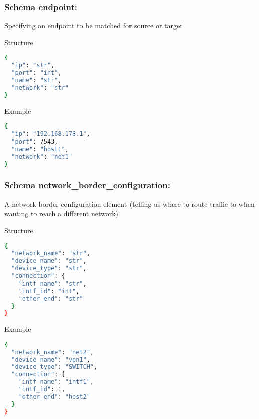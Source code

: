 \newpage
\subsubsection{Schema endpoint:}
\label{dsmf_endpoint}
Specifying an endpoint to be matched for source or target
\begin{codes}
\item[Structure] \begin{lstlisting}[language=bash]
{
  "ip": "str",
  "port": "int",
  "name": "str",
  "network": "str"
}
\end{lstlisting}
\end{codes}
\begin{codes}
\item[Example] \begin{lstlisting}[language=bash]
{
  "ip": "192.168.178.1",
  "port": 7543,
  "name": "host1",
  "network": "net1"
}
\end{lstlisting}
\end{codes}

\newpage
\subsubsection{Schema network\_border\_configuration:}
\label{dsmf_network_border_configuration}
A network border configuration element (telling us where to route traffic to when wanting to reach a different network)
\begin{codes}
\item[Structure] \begin{lstlisting}[language=bash]
{
  "network_name": "str",
  "device_name": "str",
  "device_type": "str",
  "connection": {
    "intf_name": "str",
    "intf_id": "int",
    "other_end": "str"
  }
}
\end{lstlisting}
\end{codes}
\begin{codes}
\item[Example] \begin{lstlisting}[language=bash]
{
  "network_name": "net2",
  "device_name": "vpn1",
  "device_type": "SWITCH",
  "connection": {
    "intf_name": "intf1",
    "intf_id": 1,
    "other_end": "host2"
  }
}
\end{lstlisting}
\end{codes}

\newpage
